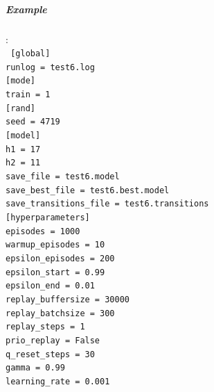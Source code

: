 \documentclass{article}
\begin{document}
\subparagraph{Example}
:\\
\tiny
\texttt{
{[global]} \\
runlog = test6.log \\
{[mode]} \\
train = 1 \\
{[rand]} \\
seed = 4719 \\
{[model]} \\
h1 = 17 \\
h2 = 11 \\
save\_file = test6.model \\
save\_best\_file = test6.best.model \\
save\_transitions\_file = test6.transitions \\
{[hyperparameters]} \\
episodes           = 1000 \\
warmup\_episodes    = 10 \\
epsilon\_episodes   = 200 \\
epsilon\_start      = 0.99 \\
epsilon\_end        = 0.01 \\
replay\_buffersize  = 30000 \\
replay\_batchsize   = 300 \\
replay\_steps       = 1 \\
prio\_replay        = False \\
q\_reset\_steps      = 30 \\
gamma              = 0.99 \\
learning\_rate      = 0.001
}

\normalsize
\end{document}
